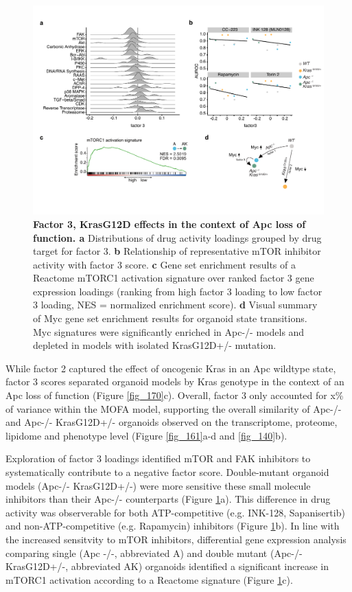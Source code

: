 \begin{flushleft}
\begin{figure}[h]
\centering
\includegraphics[scale=0.75,
                keepaspectratio]{figures/adenomaprofiling/pdf/fig_4_1.pdf}
\caption{\textbf{Factor 3, KrasG12D effects in the context of Apc loss of function. a} Distributions of drug activity loadings grouped by drug target for factor 3. \textbf{b} Relationship of representative mTOR inhibitor activity with factor 3 score. \textbf{c} Gene set enrichment results of a Reactome mTORC1 activation signature over ranked factor 3 gene expression loadings (ranking from high factor 3 loading to low factor 3 loading, NES = normalized enrichment score). \textbf{d} Visual summary of Myc gene set enrichment results for organoid state transitions. Myc signatures were significantly enriched in Apc-/- models and depleted in models with isolated KrasG12D+/- mutation.}
\label{fig_300}
\end{figure}

While factor 2 captured the effect of oncogenic Kras in an Apc wildtype state, factor 3 scores separated organoid models by Kras genotype in the context of an Apc loss of function (Figure \ref{fig_170}c). Overall, factor 3 only accounted for x\% of variance within the MOFA model, supporting the overall similarity of Apc-/- and Apc-/- KrasG12D+/- organoids observed on the transcriptome, proteome, lipidome and phenotype level (Figure \ref{fig_161}a-d and \ref{fig_140}b).
\smallbreak

Exploration of factor 3 loadings identified mTOR and FAK inhibitors to systematically contribute to a negative factor score. Double-mutant organoid models (Apc-/- KrasG12D+/-) were more sensitive these small molecule inhibitors than their Apc-/- counterparts (Figure \ref{fig_300}a). This difference in drug activity was observerable for both ATP-competitive (e.g. INK-128, Sapanisertib) and non-ATP-competitive (e.g. Rapamycin) inhibitors (Figure \ref{fig_300}b). In line with the increased sensitvity to mTOR inhibitors, differential gene expression analysis comparing single (Apc -/-, abbreviated A) and double mutant (Apc-/- KrasG12D+/-, abbreviated AK) organoids identified a significant increase in mTORC1 activation according to a Reactome signature (Figure \ref{fig_300}c). 



\end{flushleft}
